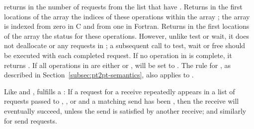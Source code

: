  returns in  the number of requests from the list
 that have .  Returns in the first
 locations of the array 
the indices of these operations within the
array ; the array is indexed from zero in
C and from one in
Fortran.  Returns in the first 
locations of the array 
the status for these  operations.
However, unlike test or wait, it does not
deallocate or  any requests in ;
a subsequent call to test, wait or free
should be executed with each completed request. If no operation in 
is complete, it returns . If all operations in  are either
 or ,  will be set to .
The 
rule for , as described in Section~\ref{subsec:pt2pt-semantics}, also applies to .


Like  and ,
 fulfills a
: If a request for a receive repeatedly
appears in a list of requests passed to ,
, or \linebreak{} and
a matching send has been , then the receive
will eventually succeed, unless the send is satisfied by another receive; and
similarly for send requests.


